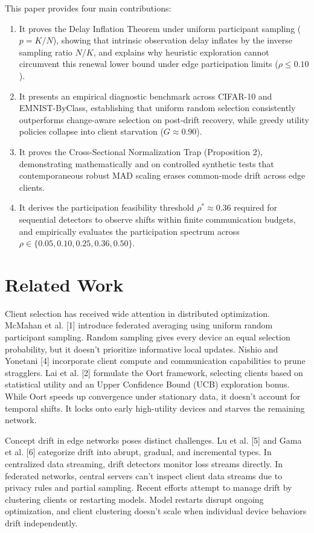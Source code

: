 \documentclass[conference]{IEEEtran}
\begin{document}
This paper provides four main contributions:
\begin{enumerate}
    \item It proves the Delay Inflation Theorem under uniform participant sampling ($p = K/N$), showing that intrinsic observation delay inflates by the inverse sampling ratio $N/K$, and explains why heuristic exploration cannot circumvent this renewal lower bound under edge participation limits ($\rho \le 0.10$).
    \item It presents an empirical diagnostic benchmark across CIFAR-10 and EMNIST-ByClass, establishing that uniform random selection consistently outperforms change-aware selection on post-drift recovery, while greedy utility policies collapse into client starvation ($G \approx 0.90$).
    \item It proves the Cross-Sectional Normalization Trap (Proposition 2), demonstrating mathematically and on controlled synthetic tests that contemporaneous robust MAD scaling erases common-mode drift across edge clients.
    \item It derives the participation feasibility threshold $\rho^* \approx 0.36$ required for sequential detectors to observe shifts within finite communication budgets, and empirically evaluates the participation spectrum across $\rho \in \{0.05, 0.10, 0.25, 0.36, 0.50\}$.
\end{enumerate}

\section{Related Work}
Client selection has received wide attention in distributed optimization. McMahan et al. [1] introduce federated averaging using uniform random participant sampling. Random sampling gives every device an equal selection probability, but it doesn't prioritize informative local updates. Nishio and Yonetani [4] incorporate client compute and communication capabilities to prune stragglers. Lai et al. [2] formulate the Oort framework, selecting clients based on statistical utility and an Upper Confidence Bound (UCB) exploration bonus. While Oort speeds up convergence under stationary data, it doesn't account for temporal shifts. It locks onto early high-utility devices and starves the remaining network.

Concept drift in edge networks poses distinct challenges. Lu et al. [5] and Gama et al. [6] categorize drift into abrupt, gradual, and incremental types. In centralized data streaming, drift detectors monitor loss streams directly. In federated networks, central servers can't inspect client data streams due to privacy rules and partial sampling. Recent efforts attempt to manage drift by clustering clients or restarting models. Model restarts disrupt ongoing optimization, and client clustering doesn't scale when individual device behaviors drift independently.
\end{document}
